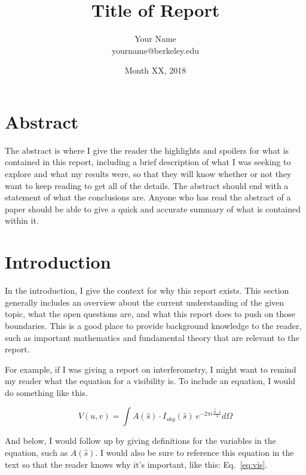 \documentclass[11pt]{article}
\makeatletter
\newcommand{\thetitle}{Title of Report}
\newcommand{\theauthor}{Your Name}
\newcommand{\theauthorsemail}{yourname@berkeley.edu}
\newcommand{\thedate}{Month XX, 2018}
\makeatother
\begin{document}
\title{
    \sffamily\bfseries\huge
    \thetitle \\
}
\author{
    \sffamily\theauthor \\
    \sffamily\theauthorsemail
}
\date{\thedate}
\maketitle
\sloppy

\section{Abstract}

The abstract is where I give the reader the highlights and spoilers for what is 
contained in this report, including a brief description of what I was seeking 
to explore and what my results were, so that they will know whether or not they 
want to keep reading to get all of the details. The abstract should end with a 
statement of what the conclusions are.  Anyone who has read the abstract of a 
paper should be able to give a quick and accurate summary of what is contained 
within it.

\section{Introduction}

In the introduction, I give the context for why this report exists. This 
section generally includes an overview about the current understanding of the 
given topic, what the open questions are, and what this report does to push on 
those boundaries. This is a good place to provide background knowledge to the 
reader, such as important mathematics and fundamental theory that are relevant 
to the report.

For example, if I was giving a report on interferometry, I might want to remind 
my reader what the equation for a visibility is. To include an equation, I 
would do something like this.

\begin{equation}
    \label{eq:vis}
    V(u,v) = \int A(\hat{s}) \cdot I_{sky}(\hat{s}) ~e^{-2 \pi i \frac{\vec{b} 
    \cdot \hat{s}}{\lambda}} d\Omega
\end{equation}

And below, I would follow up by giving definitions for the variables in the 
equation, such as $A(\hat{s})$. I would also be sure to reference this equation 
in the text so that the reader knows why it's important, like this: 
Eq.~\eqref{eq:vis}.
\end{document}
